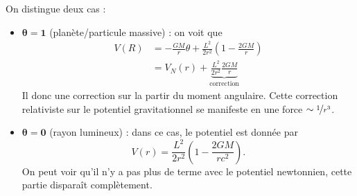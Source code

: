 \documentclass[a4paper,11pt]{report}
\begin{document}
            On distingue deux cas :
            \begin{itemize}[label = \textbullet]
                \item $\boldsymbol{\theta = 1}$ (planète/particule massive) : on voit que 
                \begin{align}
                    V(R) &= -\frac{GM}{r}\theta+\frac{L^2}{2r^2}\left( 1-\frac{2GM}{r} \right)\\
                    &= V_N(r)+\underbrace{\frac{L^2}{2r^2}\frac{2GM}{r}}_{\text{correction}}
                \end{align}
                Il donc une correction sur la partir du moment angulaire. Cette correction relativiste sur le potentiel gravitationnel se manifeste en une force $\sim\nicefrac{1}{r^3}$. 
                \item $\boldsymbol{\theta = 0}$ (rayon lumineux) : dans ce cas, le potentiel est donnée par
                \begin{equation}
                    V(r) = \frac{L^2}{2r^2}\left( 1-\frac{2GM}{rc^2} \right).
                \end{equation}
                On peut voir qu'il n'y a pas plus de terme avec le potentiel newtonnien, cette partie disparaît complètement.
            \end{itemize}
            
            
\end{document}

